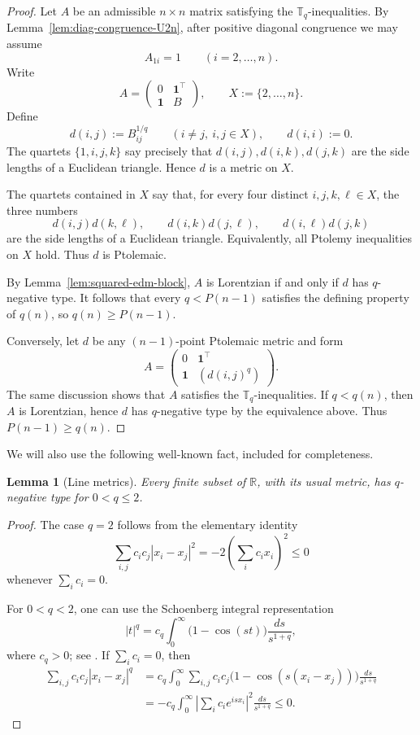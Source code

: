 \documentclass[12pt]{amsart}
\newtheorem{lemma}[theorem]{Lemma}
\theoremstyle{definition}
\newcommand{\1}{\mathbf{1}}
\newcommand\R{{\mathbb R}}
\newcommand\T{{\mathbb T}}
\begin{document}
\begin{proof}
Let $A$ be an admissible $n\times n$ matrix satisfying the
$\T_q$-inequalities.  By Lemma~\ref{lem:diag-congruence-U2n}, after positive
diagonal congruence we may assume
\[
        A_{1i}=1\qquad (i=2,\dots,n).
\]
Write
\[
        A=
        \begin{pmatrix}
        0&\1^\top\\
        \1&B
        \end{pmatrix},
        \qquad
        X:=\{2,\dots,n\}.
\]
Define
\[
        d(i,j):=B_{ij}^{1/q}\qquad (i\ne j,\ i,j\in X),
        \qquad
        d(i,i):=0.
\]
The quartets $\{1,i,j,k\}$ say precisely that $d(i,j),d(i,k),d(j,k)$ are the
side lengths of a Euclidean triangle.  Hence $d$ is a metric on $X$.

The quartets contained in $X$ say that, for every four distinct
$i,j,k,\ell\in X$, the three numbers
\[
        d(i,j)d(k,\ell),\qquad
        d(i,k)d(j,\ell),\qquad
        d(i,\ell)d(j,k)
\]
are the side lengths of a Euclidean triangle.  Equivalently, all Ptolemy inequalities
on $X$ hold.  Thus $d$ is Ptolemaic.

By Lemma~\ref{lem:squared-edm-block}, $A$ is Lorentzian if and only if $d$ has $q$-negative type.  It follows that every
$q<P(n-1)$ satisfies the defining property of $q(n)$, so $q(n)\ge P(n-1)$.

Conversely, let $d$ be any $(n-1)$-point Ptolemaic metric and form
\[
        A=
        \begin{pmatrix}
        0&\1^\top\\
        \1&(d(i,j)^q)
        \end{pmatrix}.
\]
The same discussion shows that $A$ satisfies the $\T_q$-inequalities.  If
$q<q(n)$, then $A$ is Lorentzian, hence $d$ has $q$-negative type by the
equivalence above. Thus $P(n-1)\ge q(n)$.
\end{proof}

We will also use the following well-known fact, included for completeness.

\begin{lemma}[Line metrics]
\label{lem:q5-line-metrics}
Every finite subset of $\R$, with its usual metric, has $q$-negative type for
$0<q\le2$.
\end{lemma}

\begin{proof}
The case $q=2$ follows from the elementary identity
\[
\sum_{i,j} c_i c_j |x_i-x_j|^2
=
-2\left(\sum_i c_i x_i\right)^2
\le0
\]
whenever $\sum_i c_i=0$.

For $0<q<2$, one can use the Schoenberg integral representation
\[
        |t|^q
        =
        c_q\int_0^\infty \bigl(1-\cos(st)\bigr)\frac{ds}{s^{1+q}},
\]
where $c_q>0$; see \cite{Schoenberg38}.  If $\sum_i c_i=0$, then
\[
\begin{aligned}
        \sum_{i,j}c_ic_j|x_i-x_j|^q
        &=
        c_q\int_0^\infty
        \sum_{i,j}c_ic_j\bigl(1-\cos(s(x_i-x_j))\bigr)\frac{ds}{s^{1+q}}  \\
        &=
        -c_q\int_0^\infty
        \left|\sum_i c_i e^{isx_i}\right|^2
        \frac{ds}{s^{1+q}}
        \le0.
\end{aligned}
\]
\end{proof}
\end{document}
